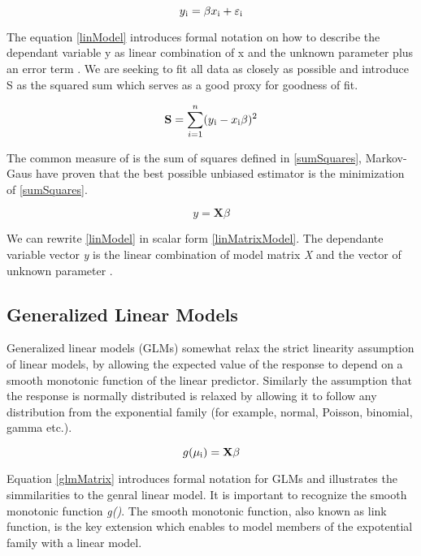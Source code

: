 \documentclass{article}
\begin{document}
    \begin{equation}  \label{linModel} y\textsubscript{i} = \beta x\textsubscript{i} + \varepsilon\textsubscript{i} \end{equation}

    The equation \ref{linModel} introduces formal notation on how to describe the dependant variable y as linear combination of x and the unknown parameter \textbeta plus an error term \textepsilon. We are seeking \textbeta to fit all data as closely as possible and introduce S as the squared sum which serves as a good proxy for goodness of fit.

    \begin{equation} \label{sumSquares} \mathbf{S} =  \sum_{i=1}^{n}(y\textsubscript{i} - x\textsubscript{i}\beta)^{2} \end{equation}

    The common measure of \textbeta is the sum of squares defined in \ref{sumSquares}, Markov-Gaus have proven that the best possible unbiased estimator is \textbeta  the minimization of \ref{sumSquares}.

    \begin{equation}  \label{linMatrixModel} y =  \mathbf{X} \beta \end{equation}

    We can rewrite \ref{linModel} in scalar form \ref{linMatrixModel}. The dependante variable vector \textit{y} is the linear combination of model matrix \textit{X} and the vector of unknown parameter \textbeta.

    \subsection{Generalized Linear Models}
    Generalized linear models (GLMs) somewhat relax the strict linearity assumption of linear models, by allowing the expected value of the response to depend on a smooth monotonic function of the linear predictor. Similarly the assumption that the response is normally distributed is relaxed by allowing it to follow any distribution from the exponential family (for example, normal, Poisson, binomial, gamma etc.).

    \begin{equation} \label{glmMatrix} g(\mu\textsubscript{i}) = \mathbf{X} \beta \end{equation}

    Equation \ref{glmMatrix} introduces formal notation for GLMs and illustrates the simmilarities to the genral linear model. It is important to recognize the smooth monotonic function \textit{g()}. The smooth monotonic function, also known as link function, is the key extension which enables to model members of the expotential family with a linear model.
\end{document}
